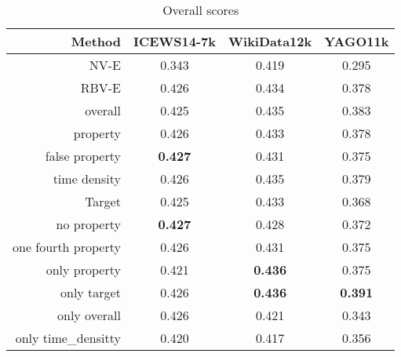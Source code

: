 \begin{table}[htb]
\centering
\begin{minipage}{\columnwidthcaption}
\centering
\caption{Overall scores}
\vspace{-3mm}

\begin{tabular}{r|SSS} \hline
Method & {\mbox{ICEWS14-7k}} & {WikiData12k} & {YAGO11k} \\ \hline
NV-E & 0.343 & 0.419 & 0.295 \\
RBV-E & 0.426 & 0.434 & 0.378 \\
overall & 0.425 & 0.435 & 0.383 \\
property & 0.426 & 0.433 & 0.378 \\
false property & \textbf{0.427} & 0.431 & 0.375 \\
time density & 0.426 & 0.435 & 0.379 \\
Target & 0.425 & 0.433 & 0.368 \\
no property & \textbf{0.427} & 0.428 & 0.372 \\
one fourth property & 0.426 & 0.431 & 0.375 \\
only property & 0.421 & \textbf{0.436} & 0.375 \\
only target & 0.426 & \textbf{0.436} & \textbf{0.391} \\
only overall & 0.426 & 0.421 & 0.343 \\
only time_densitty & 0.420 & 0.417 & 0.356 \\
\hline
\end{tabular}

\label{tab:overall_scores}
\end{minipage}
\end{table}

